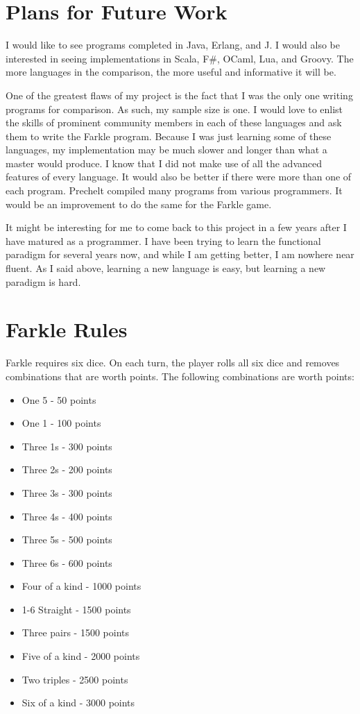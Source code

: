 \documentclass{article}
\begin{document}
\section{Plans for Future Work}

I would like to see programs completed in Java, Erlang, and J.  I would also be
interested in seeing implementations in Scala, F\#, OCaml, Lua, and Groovy.
The more languages in the comparison, the more useful and informative it will
be.

One of the greatest flaws of my project is the fact that I was the only one
writing programs for comparison.  As such, my sample size is one.  I would love
to enlist the skills of prominent community members in each of
these languages and ask them to write the Farkle program.  Because I was just
learning some of these languages, my implementation may be much slower and
longer than what a master would produce.  I know that I did not make use of all
the advanced features of every language.  It would also be better if there were
more than one of each program.  Prechelt compiled many programs from various
programmers.  It would be an improvement to do the same for the Farkle
game.

It might be interesting for me to come back to this project in a few years
after I have matured as a programmer.  I have been trying to learn the
functional paradigm for several years now, and while I am getting better, I am
nowhere near fluent.  As I said above, learning a new language is easy, but
learning a new paradigm is hard.




\appendix
\section{Farkle Rules}
\label{sec:farklerules}

Farkle requires six dice.  On each turn, the player rolls all six dice and
removes combinations that are worth points.  The following combinations are
worth points:

\begin{itemize}
\item One 5 - 50 points
\item One 1 - 100 points
\item Three 1s - 300 points
\item Three 2s - 200 points
\item Three 3s - 300 points
\item Three 4s - 400 points
\item Three 5s - 500 points
\item Three 6s - 600 points
\item Four of a kind - 1000 points
\item 1-6 Straight   - 1500 points
\item Three pairs    - 1500 points
\item Five of a kind - 2000 points
\item Two triples    - 2500 points
\item Six of a kind  - 3000 points
\end{itemize}
\end{document}
